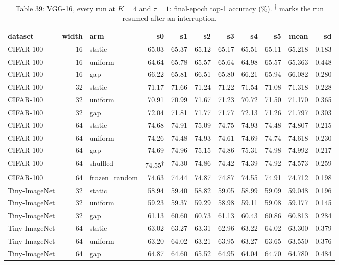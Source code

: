 \documentclass{article}
\begin{document}
\begin{table}
\caption{Table 39: VGG-16, every run at $K=4$ and $\tau=1$: final-epoch top-1
accuracy (\%). \textsuperscript{†} marks the run resumed after an
interruption.}

\begin{tabular}{l r l rrrrrr rr}
\toprule
dataset & width & arm & s0 & s1 & s2 & s3 & s4 & s5 & mean & sd \\
\midrule
CIFAR‑100 & 16 & static & 65.03 & 65.37 & 65.12 & 65.17 & 65.51 & 65.11 & 65.218 & 0.183 \\
CIFAR‑100 & 16 & uniform & 64.64 & 65.78 & 65.57 & 65.64 & 64.98 & 65.57 & 65.363 & 0.448 \\
CIFAR‑100 & 16 & gap & 66.22 & 65.81 & 66.51 & 65.80 & 66.21 & 65.94 & 66.082 & 0.280 \\
CIFAR‑100 & 32 & static & 71.17 & 71.66 & 71.24 & 71.22 & 71.54 & 71.08 & 71.318 & 0.228 \\
CIFAR‑100 & 32 & uniform & 70.91 & 70.99 & 71.67 & 71.23 & 70.72 & 71.50 & 71.170 & 0.365 \\
CIFAR‑100 & 32 & gap & 72.04 & 71.81 & 71.77 & 71.77 & 72.13 & 71.26 & 71.797 & 0.303 \\
CIFAR‑100 & 64 & static & 74.68 & 74.91 & 75.09 & 74.75 & 74.93 & 74.48 & 74.807 & 0.215 \\
CIFAR‑100 & 64 & uniform & 74.26 & 74.48 & 74.93 & 74.61 & 74.69 & 74.74 & 74.618 & 0.230 \\
CIFAR‑100 & 64 & gap & 74.69 & 74.96 & 75.15 & 74.86 & 75.31 & 74.98 & 74.992 & 0.217 \\
CIFAR‑100 & 64 & shuffled & 74.55\textsuperscript{†} & 74.30 & 74.86 & 74.42 & 74.39 & 74.92 & 74.573 & 0.259 \\
CIFAR‑100 & 64 & frozen\_random & 74.63 & 74.44 & 74.87 & 74.87 & 74.55 & 74.91 & 74.712 & 0.198 \\
Tiny‑ImageNet & 32 & static & 58.94 & 59.40 & 58.82 & 59.05 & 58.99 & 59.09 & 59.048 & 0.196 \\
Tiny‑ImageNet & 32 & uniform & 59.23 & 59.37 & 59.29 & 58.98 & 59.11 & 59.08 & 59.177 & 0.145 \\
Tiny‑ImageNet & 32 & gap & 61.13 & 60.60 & 60.73 & 61.13 & 60.43 & 60.86 & 60.813 & 0.284 \\
Tiny‑ImageNet & 64 & static & 63.02 & 63.27 & 63.31 & 62.96 & 63.22 & 64.02 & 63.300 & 0.379 \\
Tiny‑ImageNet & 64 & uniform & 63.20 & 64.02 & 63.21 & 63.95 & 63.27 & 63.65 & 63.550 & 0.376 \\
Tiny‑ImageNet & 64 & gap & 64.87 & 64.60 & 65.52 & 64.95 & 64.04 & 64.70 & 64.780 & 0.484 \\
\bottomrule
\end{tabular}
\end{table}
\end{document}
